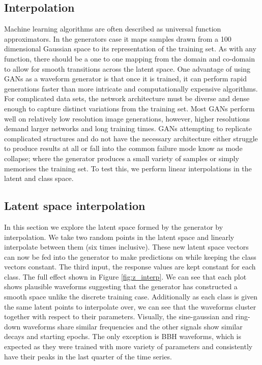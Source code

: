 \documentclass[12pt]{iopart}
\begin{document}
\subsection{Interpolation}
Machine learning algorithms are often described as universal function approximators. In the generators case it maps samples drawn from a 100 dimensional Gaussian space to its representation of the training set. As with any function, there should be a one to one mapping from the domain and co-domain to allow for smooth transitions across the latent space. One advantage of using GANs as a waveform generator is that once it is trained, it can perform rapid generations faster than more intricate and computationally expensive algorithms. For complicated data sets, the network architecture must be diverse and dense enough to capture distinct variations from the training set. Most GANs perform well on relatively low resolution image generations, however, higher resolutions demand larger networks and long training times. GANs attempting to replicate complicated structures and do not have the necessary architecture either struggle to produce results at all or fall into the common failure mode know as mode collapse; where the generator produces a small variety of samples or simply memorises the training set. To test this, we perform linear interpolations in the latent and class space. 

\subsection{Latent space interpolation}
In this section we explore the latent space formed by the generator by interpolation. We take two random points in the latent space and linearly interpolate between them (six times inclusive). These new latent space vectors can now be fed into the generator to make predictions on while keeping the class vectors constant. The third input, the response values are kept constant for each class. The full effect shown in Figure \ref{fig:z_interp}. We can see that each plot shows plausible waveforms suggesting that the generator has constructed a smooth space unlike the discrete training case. Additionally as each class is given the same latent points to interpolate over, we can see that the waveforms cluster together with respect to their parameters. Visually, the sine-gaussian and ring-down waveforms share similar frequencies and the other signals show similar decays and starting epochs. The only exception is BBH waveforms, which is expected as they were trained with more variety of parameters and consistently have their peaks in the last quarter of the time series.
\end{document}
